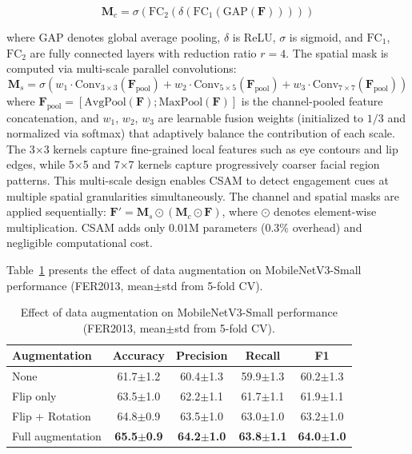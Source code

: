 \documentclass[sensors,article,submit,pdftex,moreauthors]{Definitions/mdpi}
\begin{document}
\begin{equation}
\mathbf{M}_c = \sigma(\text{FC}_2(\delta(\text{FC}_1(\text{GAP}(\mathbf{F})))))
\end{equation}

where GAP denotes global average pooling, $\delta$ is ReLU, $\sigma$ is sigmoid, and $\text{FC}_1$, $\text{FC}_2$ are fully connected layers with reduction ratio $r=4$. The spatial mask is computed via multi-scale parallel convolutions:
\begin{equation}
\mathbf{M}_s = \sigma\!\left(w_1 \cdot \text{Conv}_{3\times3}(\mathbf{F}_{\text{pool}}) + w_2 \cdot \text{Conv}_{5\times5}(\mathbf{F}_{\text{pool}}) + w_3 \cdot \text{Conv}_{7\times7}(\mathbf{F}_{\text{pool}})\right)
\end{equation}
where $\mathbf{F}_{\text{pool}} = [\text{AvgPool}(\mathbf{F}); \text{MaxPool}(\mathbf{F})]$ is the channel-pooled feature concatenation, and $w_1$, $w_2$, $w_3$ are learnable fusion weights (initialized to $1/3$ and normalized via softmax) that adaptively balance the contribution of each scale. The 3$\times$3 kernels capture fine-grained local features such as eye contours and lip edges, while 5$\times$5 and 7$\times$7 kernels capture progressively coarser facial region patterns. This multi-scale design enables CSAM to detect engagement cues at multiple spatial granularities simultaneously. The channel and spatial masks are applied sequentially: $\mathbf{F}' = \mathbf{M}_s \odot (\mathbf{M}_c \odot \mathbf{F})$, where $\odot$ denotes element-wise multiplication. CSAM adds only 0.01M parameters (0.3\% overhead) and negligible computational cost.

Table~\ref{tab:augmentation} presents the effect of data augmentation on MobileNetV3-Small performance (FER2013, mean$\pm$std from 5-fold CV).

\begin{table}[H]
\caption{Effect of data augmentation on MobileNetV3-Small performance (FER2013, mean$\pm$std from 5-fold CV).}
\label{tab:augmentation}
\begin{tabular}{lcccc}
\toprule
\textbf{Augmentation} & \textbf{Accuracy} & \textbf{Precision} & \textbf{Recall} & \textbf{F1} \\
\midrule
None & 61.7$\pm$1.2 & 60.4$\pm$1.3 & 59.9$\pm$1.3 & 60.2$\pm$1.3 \\
Flip only & 63.5$\pm$1.0 & 62.2$\pm$1.1 & 61.7$\pm$1.1 & 61.9$\pm$1.1 \\
Flip + Rotation & 64.8$\pm$0.9 & 63.5$\pm$1.0 & 63.0$\pm$1.0 & 63.2$\pm$1.0 \\
Full augmentation & \textbf{65.5$\pm$0.9} & \textbf{64.2$\pm$1.0} & \textbf{63.8$\pm$1.1} & \textbf{64.0$\pm$1.0} \\
\bottomrule
\end{tabular}
\end{table}
\end{document}
